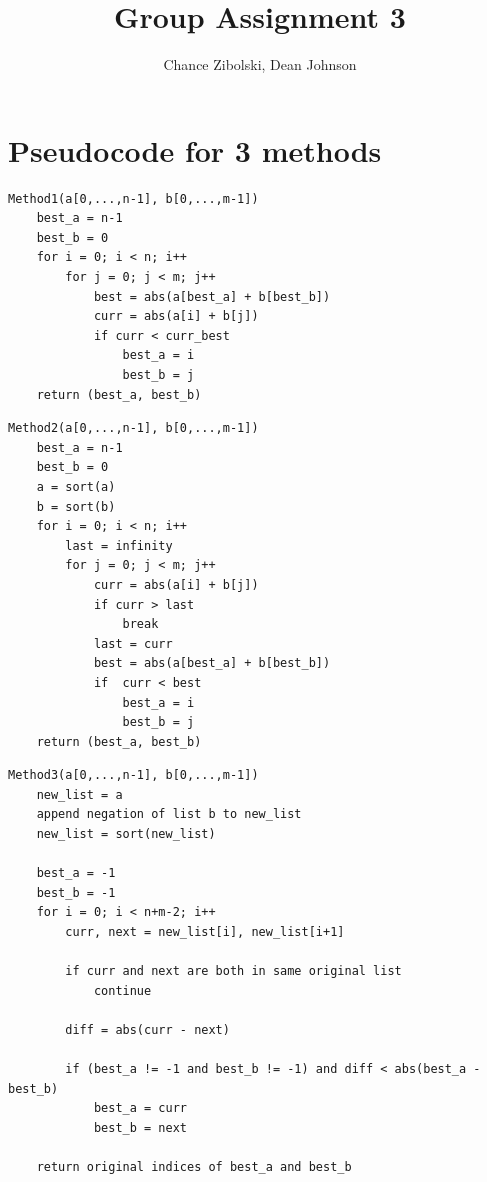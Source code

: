 \documentclass{article}
\title{Group Assignment 3}
\author{Chance Zibolski, Dean Johnson}
\begin{document}
\maketitle

\section{Pseudocode for 3 methods}
\begin{verbatim}
Method1(a[0,...,n-1], b[0,...,m-1])
    best_a = n-1
    best_b = 0
    for i = 0; i < n; i++
        for j = 0; j < m; j++
            best = abs(a[best_a] + b[best_b])
            curr = abs(a[i] + b[j])
            if curr < curr_best
                best_a = i
                best_b = j
    return (best_a, best_b)
\end{verbatim}

\begin{verbatim}
Method2(a[0,...,n-1], b[0,...,m-1])
    best_a = n-1
    best_b = 0
    a = sort(a)
    b = sort(b)
    for i = 0; i < n; i++
        last = infinity
        for j = 0; j < m; j++
            curr = abs(a[i] + b[j])
            if curr > last
                break
            last = curr
            best = abs(a[best_a] + b[best_b])
            if  curr < best
                best_a = i
                best_b = j
    return (best_a, best_b)
\end{verbatim}

\begin{verbatim}
Method3(a[0,...,n-1], b[0,...,m-1])
    new_list = a
    append negation of list b to new_list
    new_list = sort(new_list)

    best_a = -1
    best_b = -1
    for i = 0; i < n+m-2; i++
        curr, next = new_list[i], new_list[i+1]

        if curr and next are both in same original list
            continue

        diff = abs(curr - next)

        if (best_a != -1 and best_b != -1) and diff < abs(best_a - best_b)
            best_a = curr
            best_b = next

    return original indices of best_a and best_b
\end{verbatim}
\end{document}

